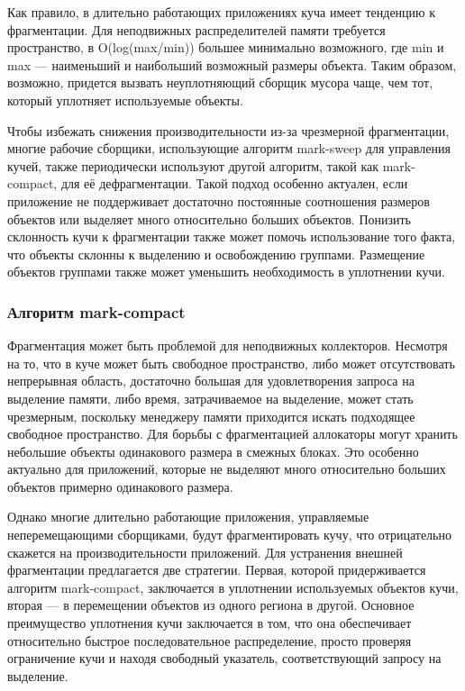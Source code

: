 Как правило, в длительно работающих приложениях куча имеет тенденцию к фрагментации. Для неподвижных распределителей памяти требуется пространство, в O(log(max/min)) большее минимально возможного, где min и max --- наименьший и наибольший возможный размеры объекта. Таким образом, возможно, придется вызвать неуплотняющий сборщик мусора чаще, чем тот, который уплотняет используемые объекты. \cite{handbook}

Чтобы избежать снижения производительности из-за чрезмерной фрагментации, многие рабочие сборщики, использующие алгоритм mark-sweep для управления кучей, также периодически используют другой алгоритм, такой как mark-compact, для её дефрагментации. Такой подход особенно актуален, если приложение не поддерживает достаточно постоянные соотношения размеров объектов или выделяет много относительно больших объектов. Понизить склонность кучи к фрагментации также может помочь использование того факта, что объекты склонны к выделению и освобождению группами. Размещение объектов группами также может уменьшить необходимость в уплотнении кучи. \cite{handbook}



\subsubsection{Алгоритм mark-compact}

Фрагментация может быть проблемой для неподвижных коллекторов. Несмотря на то, что в куче может быть свободное пространство, либо может отсутствовать непрерывная область, достаточно большая для удовлетворения запроса на выделение памяти, либо время, затрачиваемое на выделение, может стать чрезмерным, поскольку менеджеру памяти приходится искать подходящее свободное пространство. Для борьбы с фрагментацией аллокаторы могут хранить небольшие объекты одинакового размера в смежных блоках. Это особенно актуально для приложений, которые не выделяют много относительно больших объектов примерно одинакового размера.  \cite{handbook}

Однако многие длительно работающие приложения, управляемые неперемещающими сборщиками, будут фрагментировать кучу, что отрицательно скажется на производительности приложений. Для устранения внешней фрагментации предлагается две стратегии. Первая, которой придерживается алгоритм mark-compact, заключается в уплотнении используемых объектов кучи, вторая --- в перемещении объектов из одного региона в другой. Основное преимущество уплотнения кучи заключается в том, что она обеспечивает относительно быстрое последовательное распределение, просто проверяя ограничение кучи и находя свободный указатель, соответствующий запросу на выделение. \cite{handbook}

